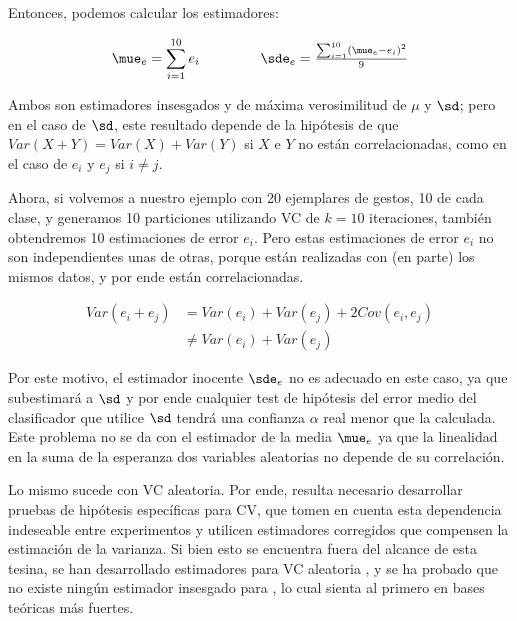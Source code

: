 Entonces, podemos calcular los estimadores:

\begin{equation}
  \mue_e=\sum_{i=1}^{10} e_i$  \qquad \qquad  $\sde_e= \frac{\sum_{i=1}^{10} (\mue_e-e_i)^2 }{9}
\end{equation}

Ambos son estimadores insesgados y de máxima verosimilitud de $\mu$ y $\sd$; pero en el caso de $\sd$, este resultado depende de la hipótesis de que $Var(X+Y)= Var(X) + Var(Y)$ si $X$ e $Y$ no están correlacionadas, como en el caso de $e_i$ y $e_j$ si $i \neq j$. 

Ahora, si volvemos a nuestro ejemplo con 20 ejemplares de gestos, 10 de cada clase, y generamos 10 particiones utilizando VC de $k=10$ iteraciones, también obtendremos 10 estimaciones de error $e_i$. Pero estas estimaciones de error $e_i$ no son independientes unas de otras, porque están realizadas con (en parte) los mismos datos, y por ende están correlacionadas. 

\begin{align}
  Var(e_i+e_j) &=  Var(e_i) + Var(e_j) + 2 Cov(e_i,e_j) \\
  &\neq Var(e_i)+Var(e_j)
\end{align}

Por este motivo, el estimador inocente $\sde_e$ no es adecuado en este caso, ya que subestimará a $\sd$ y por ende cualquier test de hipótesis del error medio del clasificador que utilice $\sd$ tendrá una confianza $\alpha$ real menor que la calculada. Este problema no se da con el estimador de la media $\mue_e$ ya que la linealidad en la suma de la esperanza dos variables aleatorias no depende de su correlación. 

Lo mismo sucede con VC aleatoria. Por ende, resulta necesario desarrollar pruebas de hipótesis específicas para CV, que tomen en cuenta esta dependencia indeseable entre experimentos y utilicen estimadores corregidos que compensen la estimación de la varianza. Si bien esto se encuentra fuera del alcance de esta tesina, se han desarrollado estimadores para VC aleatoria \cite{nadeau2003}, y se ha probado que no existe ningún estimador insesgado para  \kvc \cite{bengio2004}, lo cual sienta al primero en bases teóricas más fuertes.


